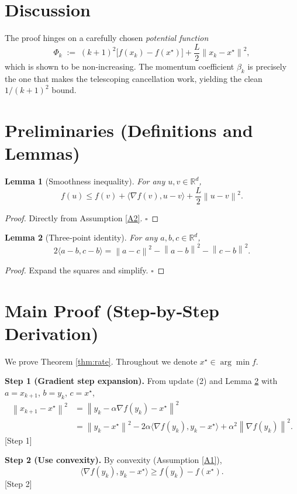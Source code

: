 \documentclass{article}
\newtheorem{lemma}{Lemma}
\newcommand{\R}{\mathbb{R}}
\newcommand{\norm}[1]{\left\lVert#1\right\rVert}
\begin{document}
\section*{Discussion}
The proof hinges on a carefully chosen \emph{potential function}
\[
\Phi_k \;:=\; (k+1)^2\bigl[f(x_k)-f(x^{\star})\bigr] + \frac{L}{2}\norm{x_k - x^{\star}}^{2},
\]
which is shown to be non‑increasing.  The momentum coefficient $\beta_k$ is precisely the one that makes the telescoping cancellation work, yielding the clean $1/(k+1)^2$ bound.

\section*{Preliminaries (Definitions and Lemmas)}
\begin{lemma}[Smoothness inequality]\label{lem:smooth}
For any $u,v\in\R^d$,
\[
f(u)\le f(v)+\langle\nabla f(v),u-v\rangle+\frac{L}{2}\norm{u-v}^{2}.
\]
\end{lemma}
\begin{proof}
Directly from Assumption \ref{A2}. \hfill $\square$
\end{proof}

\begin{lemma}[Three‑point identity]\label{lem:three}
For any $a,b,c\in\R^d$,
\[
2\langle a-b,c-b\rangle = \norm{a-c}^{2}-\norm{a-b}^{2}-\norm{c-b}^{2}.
\]
\end{lemma}
\begin{proof}
Expand the squares and simplify. \hfill $\square$
\end{proof}

\section*{Main Proof (Step‑by‑Step Derivation)}
We prove Theorem \ref{thm:rate}.  Throughout we denote $x^{\star}\in\arg\min f$.

\noindent\textbf{Step 1 (Gradient step expansion).}  
From update (2) and Lemma \ref{lem:three} with $a=x_{k+1}$, $b=y_k$, $c=x^{\star}$,
\begin{align}
\norm{x_{k+1}-x^{\star}}^{2}
&=\norm{y_k-\alpha\nabla f(y_k)-x^{\star}}^{2} \nonumber\\
&=\norm{y_k-x^{\star}}^{2}
-2\alpha\langle\nabla f(y_k),y_k-x^{\star}\rangle
+\alpha^{2}\norm{\nabla f(y_k)}^{2}. \tag{5}
\end{align}
[Step 1]

\noindent\textbf{Step 2 (Use convexity).}  
By convexity (Assumption \ref{A1}),
\[
\langle\nabla f(y_k),y_k-x^{\star}\rangle
\ge f(y_k)-f(x^{\star}). \tag{6}
\]
[Step 2]
\end{document}
